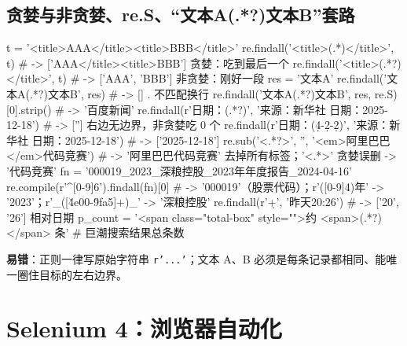 \subsection{贪婪与非贪婪、re.S、“文本A(.*?)文本B”套路}
\begin{PYQcode}
t = '<title>AAA</title><title>BBB</title>'
re.findall('<title>(.*)</title>', t)            # -> ['AAA</title><title>BBB']  贪婪：吃到最后一个
re.findall('<title>(.*?)</title>', t)           # -> ['AAA', 'BBB']              非贪婪：刚好一段
res = '文本A'
re.findall('文本A(.*?)文本B', res)                # -> []  . 不匹配换行
re.findall('文本A(.*?)文本B', res, re.S)[0].strip()   # -> '百度新闻'
re.findall(r'日期：(.*?)', '来源：新华社 日期：2025-12-18')            # -> ['']  右边无边界，非贪婪吃 0 个
re.findall(r'日期：(\d{4}-\d{2}-\d{2})', '来源：新华社 日期：2025-12-18')  # -> ['2025-12-18']
re.sub('<.*?>', '', '<em>阿里巴巴</em>代码竞赛')  # -> '阿里巴巴代码竞赛'  去掉所有标签；'<.*>' 贪婪误删 -> '代码竞赛'
fn = '000019_2023_深粮控股_2023年年度报告_2024-04-16'
re.compile(r'^[0-9]{6}').findall(fn)[0]          # -> '000019'（股票代码）；r'([0-9]{4})年' -> '2023'；r'_([\u4e00-\u9fa5]+)_' -> '深粮控股'
re.findall(r'\d+', '昨天20:26')                   # -> ['20', '26']  相对日期
p_count = '<span class="total-box" style="">约 <span>(.*?)</span> 条'   # 巨潮搜索结果总条数
\end{PYQcode}
\textbf{易错}：正则一律写原始字符串 \texttt{r'...'}；文本 A、B 必须是每条记录都相同、能唯一圈住目标的左右边界。

\section{Selenium 4：浏览器自动化}

